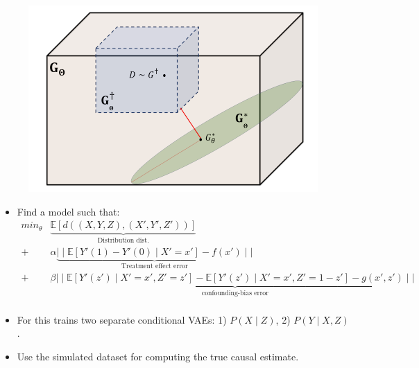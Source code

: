\documentclass{beamer}
\begin{document}
\begin{frame}
	\frametitle{}
	\begin{figure}
		\centering
		\includegraphics[scale=0.45]{imgs/distributions.png}
	\end{figure}
	\begin{itemize}
		\item Find a model such that:		
		\begin{equation*}
			\begin{split}
				min_{\theta} & \underbrace{\mathbb{E}[d((X, Y, Z), (X', Y', Z'))]}_{\text{Distribution dist.}} \\
				+ & \alpha \underbrace{\mid\mid \mathbb{E}[Y'(1) - Y'(0) \mid X'=x'] - f(x') \mid \mid}_{\text{Treatment effect error}}  \\
				+ & \beta \underbrace{\mid \mid \mathbb{E}[Y'(z') \mid X'=x', Z'=z'] - \mathbb{E}[Y'(z') \mid X'=x', Z'=1-z'] - g(x', z') \mid \mid}_{\text{confounding-bias error}} \\
			\end{split}
		\end{equation*}
		\item For this trains two separate conditional VAEs: 1) $P(X \mid Z) $, 2) $ P(Y \mid X, Z) $.
		\item Use the simulated dataset for computing the true causal estimate.
			\end{itemize}
\end{frame}
\end{document}
